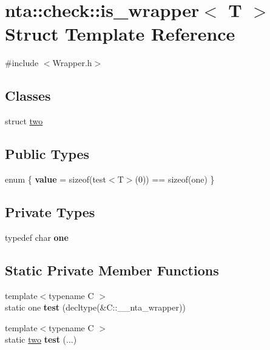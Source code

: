 \hypertarget{structnta_1_1check_1_1is__wrapper}{}\section{nta\+:\+:check\+:\+:is\+\_\+wrapper$<$ T $>$ Struct Template Reference}
\label{structnta_1_1check_1_1is__wrapper}


{\ttfamily \#include $<$Wrapper.\+h$>$}

\subsection*{Classes}
\begin{DoxyCompactItemize}
\item 
struct \hyperlink{structnta_1_1check_1_1is__wrapper_d0/ddb/structnta_1_1check_1_1is__wrapper_1_1two}{two}
\end{DoxyCompactItemize}
\subsection*{Public Types}
\begin{DoxyCompactItemize}
\item 
\mbox{\label{structnta_1_1check_1_1is__wrapper_ab3f6ce079e6ab45794886ec8aa7daf6c}} 
enum \{ {\bfseries value} = sizeof(test$<$T$>$(0)) == sizeof(one)
 \}
\end{DoxyCompactItemize}
\subsection*{Private Types}
\begin{DoxyCompactItemize}
\item 
\mbox{\label{structnta_1_1check_1_1is__wrapper_ae46a9f8e21aa39ac1f87de8d6c8303f2}} 
typedef char {\bfseries one}
\end{DoxyCompactItemize}
\subsection*{Static Private Member Functions}
\begin{DoxyCompactItemize}
\item 
\mbox{\label{structnta_1_1check_1_1is__wrapper_a61cffc2c2f35b995e37335b48de3dc83}} 
{\footnotesize template$<$typename C $>$ }\\static one {\bfseries test} (decltype(\&C\+::\+\_\+\+\_\+nta\+\_\+wrapper))
\item 
\mbox{\label{structnta_1_1check_1_1is__wrapper_ae343dee5565b19efd0cf46cef444e512}} 
{\footnotesize template$<$typename C $>$ }\\static \hyperlink{structnta_1_1check_1_1is__wrapper_d0/ddb/structnta_1_1check_1_1is__wrapper_1_1two}{two} {\bfseries test} (...)
\end{DoxyCompactItemize}


